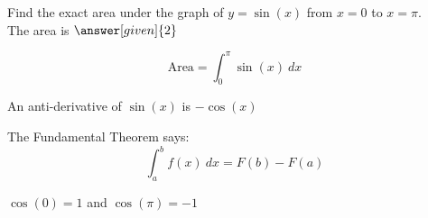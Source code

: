 \documentclass{ximera}
\begin{document}
\begin{problem} %
Find the exact area under the graph of $y = \sin(x)$ from $x = 0$ to $x = \pi$.\\
The area is $\answer[given]{2}$

\begin{hint}
  \[
  \text{Area} = \int_0^{\pi} \sin(x) \ dx 
  \]
\end{hint}
    \begin{hint}
      An anti-derivative of $\sin(x)$ is $-\cos(x)$
    \end{hint}
    
    \begin{hint}
      The Fundamental Theorem says:
      \[
      \int_a^b f(x) \ dx = F(b) - F(a)
      \]
    \end{hint}    
		\begin{hint}
      $\cos(0) = 1$ and $\cos(\pi) = -1$
    \end{hint}
		
\end{problem}
\end{document}
